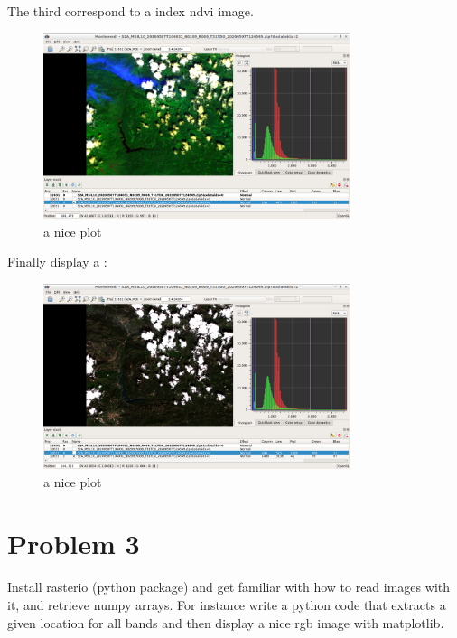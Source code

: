 \documentclass[a4paper,11pt]{article}
\theoremstyle{mytheor}
\begin{document}
The third correspond to a index ndvi image.\\

\begin{figure}[h]
    \centering
    \includegraphics[width=0.8\textwidth]{displayS2A_index2.png}
    \caption{a nice plot}
    \label{fig:mesh1}
\end{figure}

Finally display a :\\

\begin{figure}[h]
    \centering
    \includegraphics[width=0.8\textwidth]{displayS2A_2.png}
    \caption{a nice plot}
    \label{fig:mesh1}
\end{figure}




\section*{Problem 3}

Install rasterio (python package) and get familiar with how to read images with it, and retrieve numpy arrays. For instance write a python code that extracts a given location for all bands and then display a nice rgb image with matplotlib.\\
\end{document}
